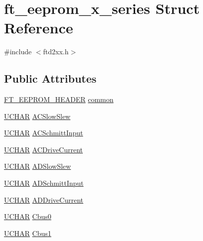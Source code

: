 \hypertarget{structft__eeprom__x__series}{
\section{ft\_\-eeprom\_\-x\_\-series Struct Reference}
\label{structft__eeprom__x__series}
}


{\ttfamily \#include $<$ftd2xx.h$>$}\subsection*{Public Attributes}
\begin{DoxyCompactItemize}
\item 
\hyperlink{structft__eeprom__header}{FT\_\-EEPROM\_\-HEADER} \hyperlink{structft__eeprom__x__series_a4d1ac63e7dc2e8e677edcc43b566dc01}{common}
\item 
\hyperlink{LALUsbx64_2include_2WinTypes_8h_a4f4bb67531a9bf6f0b9c6ad76aeba587}{UCHAR} \hyperlink{structft__eeprom__x__series_aa08fe7573f5f822e12a34973055c52e3}{ACSlowSlew}
\item 
\hyperlink{LALUsbx64_2include_2WinTypes_8h_a4f4bb67531a9bf6f0b9c6ad76aeba587}{UCHAR} \hyperlink{structft__eeprom__x__series_af0941a8b6cbcfb69a84c9e9bd9751e4e}{ACSchmittInput}
\item 
\hyperlink{LALUsbx64_2include_2WinTypes_8h_a4f4bb67531a9bf6f0b9c6ad76aeba587}{UCHAR} \hyperlink{structft__eeprom__x__series_a62017256a98fdfbd1ec5a662725f9c84}{ACDriveCurrent}
\item 
\hyperlink{LALUsbx64_2include_2WinTypes_8h_a4f4bb67531a9bf6f0b9c6ad76aeba587}{UCHAR} \hyperlink{structft__eeprom__x__series_a3a1988ab68373c2fdc375cb4c038666f}{ADSlowSlew}
\item 
\hyperlink{LALUsbx64_2include_2WinTypes_8h_a4f4bb67531a9bf6f0b9c6ad76aeba587}{UCHAR} \hyperlink{structft__eeprom__x__series_addfb6cbf3c524edfbde9dbaf37f1f5e0}{ADSchmittInput}
\item 
\hyperlink{LALUsbx64_2include_2WinTypes_8h_a4f4bb67531a9bf6f0b9c6ad76aeba587}{UCHAR} \hyperlink{structft__eeprom__x__series_a22a0cc77e2bf346e29d171194a91bc95}{ADDriveCurrent}
\item 
\hyperlink{LALUsbx64_2include_2WinTypes_8h_a4f4bb67531a9bf6f0b9c6ad76aeba587}{UCHAR} \hyperlink{structft__eeprom__x__series_a8204c3cd3a8d8ea0f1461217fdc7ce83}{Cbus0}
\item 
\hyperlink{LALUsbx64_2include_2WinTypes_8h_a4f4bb67531a9bf6f0b9c6ad76aeba587}{UCHAR} \hyperlink{structft__eeprom__x__series_ac2cfe6ac98141e7f3552a3884304a6b3}{Cbus1}

\end{DoxyCompactItemize}
